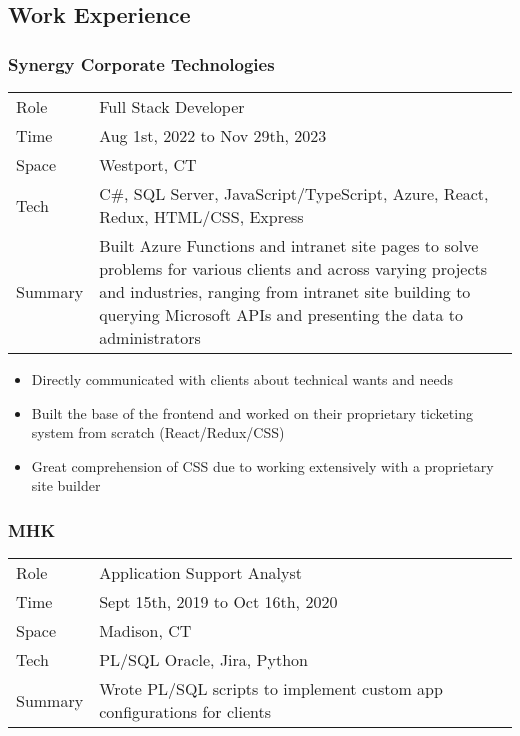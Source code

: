\documentclass[letterpaper]{article}
\providecommand{\tightlist}{%
  \setlength{\itemsep}{0pt}\setlength{\parskip}{0pt}}
\begin{document}
\hypertarget{work-experience}{%
\subsection{Work Experience}\label{work-experience}}

\hypertarget{synergy-corporate-technologies}{%
\subsubsection{Synergy Corporate
Technologies}\label{synergy-corporate-technologies}}

\begin{longtable}[]{@{}
  >{\raggedright\arraybackslash}p{}
  >{\raggedright\arraybackslash}p{}@{}}
\toprule\noalign{}
\endhead
\bottomrule\noalign{}
\endlastfoot
Role & Full Stack Developer \\
Time & Aug 1st, 2022 to Nov 29th, 2023 \\
Space & Westport, CT \\
Tech & C\#, SQL Server, JavaScript/TypeScript, Azure, React, Redux,
HTML/CSS, Express \\
Summary & Built Azure Functions and intranet site pages to solve
problems for various clients and across varying projects and industries,
ranging from intranet site building to querying Microsoft APIs and
presenting the data to administrators \\
\end{longtable}

\begin{itemize}
\tightlist
\item
  Directly communicated with clients about technical wants and needs
\item
  Built the base of the frontend and worked on their proprietary
  ticketing system from scratch (React/Redux/CSS)
\item
  Great comprehension of CSS due to working extensively with a
  proprietary site builder
\end{itemize}

\hypertarget{mhk}{%
\subsubsection{MHK}\label{mhk}}

\begin{longtable}[]{@{}
  >{\raggedright\arraybackslash}p{}
  >{\raggedright\arraybackslash}p{}@{}}
\toprule\noalign{}
\endhead
\bottomrule\noalign{}
\endlastfoot
Role & Application Support Analyst \\
Time & Sept 15th, 2019 to Oct 16th, 2020 \\
Space & Madison, CT \\
Tech & PL/SQL Oracle, Jira, Python \\
Summary & Wrote PL/SQL scripts to implement custom app configurations
for clients \\
\end{longtable}
\end{document}
